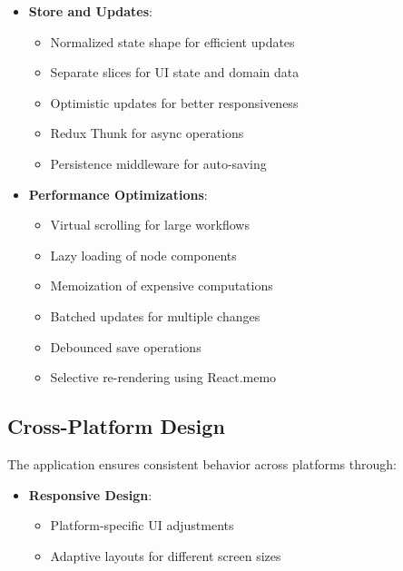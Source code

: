 \begin{itemize}
    \item \textbf{Store and Updates}:
    \begin{itemize}
        \item Normalized state shape for efficient updates
        \item Separate slices for UI state and domain data
        \item Optimistic updates for better responsiveness
        \item Redux Thunk for async operations
        \item Persistence middleware for auto-saving
    \end{itemize}
    
    \item \textbf{Performance Optimizations}:
    \begin{itemize}
        \item Virtual scrolling for large workflows
        \item Lazy loading of node components
        \item Memoization of expensive computations
        \item Batched updates for multiple changes
        \item Debounced save operations
        \item Selective re-rendering using React.memo
    \end{itemize}
\end{itemize}

\subsection{Cross-Platform Design}
The application ensures consistent behavior across platforms through:

\begin{itemize}
    \item \textbf{Responsive Design}:
    \begin{itemize}
        \item Platform-specific UI adjustments
        \item Adaptive layouts for different screen sizes
    \end{itemize}
\end{itemize}